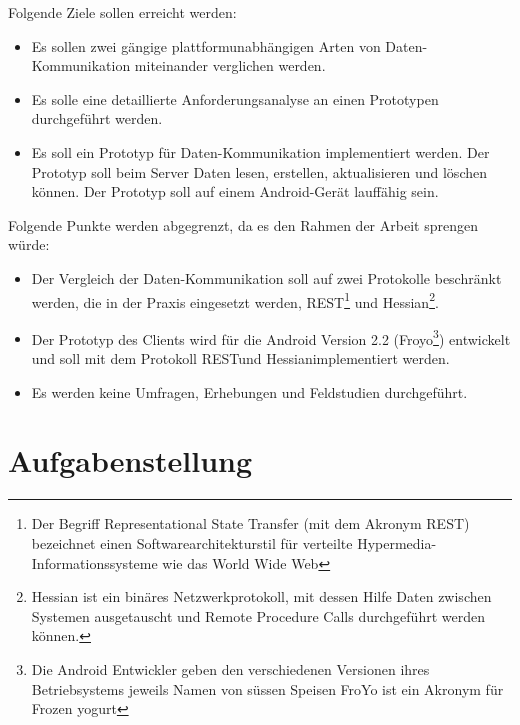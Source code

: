 \documentclass[abstracton, listof=totocnumbered,
bibliography=totocnumbered]{scrreprt}
\begin{document}
  Folgende Ziele sollen erreicht werden:
  
  \begin{itemize}
    \item Es sollen zwei gängige plattformunabhängigen Arten von
          Daten-Kommunikation miteinander verglichen werden.
    \item Es solle eine detaillierte Anforderungsanalyse an einen
          Prototypen durchgeführt werden.
    \item Es soll ein Prototyp für Daten-Kommunikation implementiert
          werden. Der Prototyp soll beim Server Daten lesen, erstellen,
          aktualisieren und löschen können. Der Prototyp soll auf einem
          Android-Gerät lauffähig sein.
  \end{itemize}
  
  Folgende Punkte werden abgegrenzt, da es den Rahmen der Arbeit sprengen 
  würde:
  
  \begin{itemize}
    \item Der Vergleich der Daten-Kommunikation soll auf zwei Protokolle
          beschränkt werden, die in der Praxis eingesetzt werden,
          \ac{REST}\footnote[1]{
            Der Begriff Representational State Transfer (mit dem Akronym
            REST) bezeichnet einen Softwarearchitekturstil für verteilte
            Hypermedia-Informationssysteme wie das World Wide Web} und
          Hessian\footnote[2]{
            Hessian ist ein binäres Netzwerkprotokoll, mit
            dessen Hilfe Daten zwischen Systemen ausgetauscht und Remote
            Procedure Calls durchgeführt werden können.}.
    \item Der Prototyp des Clients wird für die Android Version 2.2
          (Froyo\footnote[3]{
            Die Android Entwickler geben den verschiedenen Versionen
            ihres Betriebsystems jeweils Namen von süssen Speisen FroYo
            ist ein Akronym für Frozen yogurt}) entwickelt und soll mit dem
          Protokoll \ac{REST}\footnotemark[1] und Hessian\footnotemark[2]
          implementiert werden.
    \item Es werden keine Umfragen, Erhebungen und Feldstudien
          durchgeführt.
  \end{itemize}
  
  \newpage
  
  \section{Aufgabenstellung}
  
\end{document}
